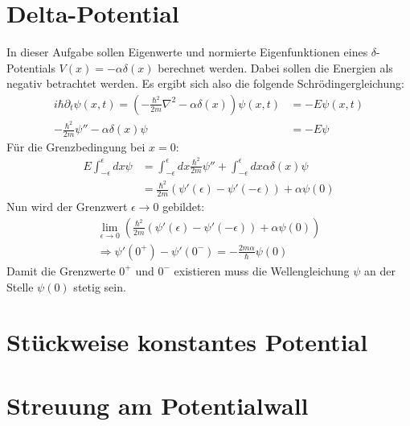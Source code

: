 \section{Delta-Potential}
In dieser Aufgabe sollen Eigenwerte und normierte Eigenfunktionen eines $\delta$-Potentials $V(x)=-\alpha\delta(x)$ berechnet werden. Dabei sollen die Energien als negativ betrachtet werden. Es ergibt sich also die folgende Schrödingergleichung:
\begin{align}
  i\hbar\partial_t \psi(x,t)=\left(-\frac{\hbar^2}{2m}\nabla^2-\alpha\delta(x)\right)\psi(x,t)&=-E\psi(x,t)	\\
  -\frac{\hbar^2}{2m}\psi''-\alpha\delta(x)\psi&=-E\psi
\end{align}
Für die Grenzbedingung bei $x=0$:
\begin{align}
  E \int^\epsilon_{-\epsilon}dx \psi &= \int^\epsilon_{-\epsilon}dx \frac{\hbar^2}{2m} \psi'' + \int^\epsilon_{-\epsilon}dx \alpha\delta(x)\psi		\\
  &= \frac{\hbar^2}{2m}\left(\psi'(\epsilon)-\psi'(-\epsilon)\right)+\alpha\psi(0)
\end{align}
Nun wird der Grenzwert $\epsilon\rightarrow 0$ gebildet:
\begin{align}
  \lim\limits_{\epsilon \rightarrow 0} \left(\frac{\hbar^2}{2m}\left(\psi'(\epsilon)-\psi'(-\epsilon)\right)+\alpha\psi(0)\right)	\\
  \Rightarrow \psi'(0^+)-\psi'(0^-)=-\frac{2m\alpha}{\hbar}\psi(0)
\end{align}
Damit die Grenzwerte $0^+$ und $0^-$ existieren muss die Wellengleichung $\psi$ an der Stelle $\psi(0)$ stetig sein.




\section{Stückweise konstantes Potential}




\section{Streuung am Potentialwall}







